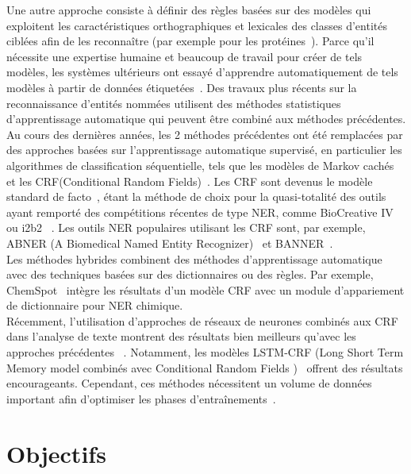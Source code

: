 Une autre approche consiste à définir des règles basées sur des modèles qui exploitent les caractéristiques orthographiques et lexicales des classes d'entités ciblées afin de les reconnaître (par exemple pour les protéines~\cite{Franzen2002}). Parce qu'il nécessite une expertise humaine et beaucoup de travail pour créer de tels modèles, les systèmes ultérieurs ont essayé d'apprendre automatiquement de tels modèles à partir de données étiquetées~\cite{Califf1999,Ciravegna1999}. Des travaux plus récents sur la reconnaissance d'entités nommées utilisent des méthodes statistiques d'apprentissage automatique qui peuvent être combiné aux méthodes précédentes. \\

Au cours des dernières années, les 2 méthodes précédentes ont été remplacées par des approches basées sur l'apprentissage automatique supervisé, en particulier les algorithmes de classification séquentielle, tels que les modèles de Markov cachés~\cite{Rabiner1989} et les CRF(Conditional Random Fields)~\cite{Lafferty2001}. Les CRF sont devenus le modèle standard de facto~\cite{Settles2004}, étant la méthode de choix pour la quasi-totalité des outils ayant remporté des compétitions récentes de type NER, comme BioCreative IV~\cite{Krallinger2013} ou i2b2~\cite{Uzuner2011} . Les outils NER populaires utilisant les CRF sont, par exemple, ABNER (A Biomedical Named Entity Recognizer)~\cite{Settles2005} et BANNER~\cite{LEAMAN2007}.\\
Les méthodes hybrides combinent des méthodes d'apprentissage automatique avec des techniques basées sur des dictionnaires ou des règles. Par exemple, ChemSpot~\cite{Rocktaschel2012} intègre les résultats d'un modèle CRF avec un module d'appariement de dictionnaire pour NER chimique.\\

Récemment, l'utilisation d'approches de réseaux de neurones combinés aux CRF dans l'analyse de texte montrent des résultats bien meilleurs qu'avec les approches précédentes ~\cite{Segura-Bedmar2015}. Notamment, les modèles LSTM-CRF (Long Short Term Memory model combinés avec Conditional Random Fields )~\cite{Lample2016} offrent des résultats encourageants. Cependant, ces méthodes nécessitent un volume de données important afin d'optimiser les phases d'entraînements~\cite{Habibi2017a}. \\
 


\section{Objectifs}
\label{Objectifs}

